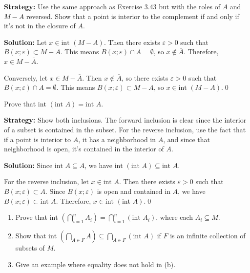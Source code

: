 \noindent\textbf{Strategy:} Use the same approach as Exercise 3.43 but with the roles of $A$ and $M-A$ reversed. Show that a point is interior to the complement if and only if it's not in the closure of $A$.

\bigskip\noindent\textbf{Solution:} Let $x \in \text{int }(M - A)$. Then there exists $\varepsilon > 0$ such that $B(x;\varepsilon) \subset M - A$. This means $B(x;\varepsilon) \cap A = \emptyset$, so $x \notin \overline{A}$. Therefore, $x \in M - \overline{A}$.

Conversely, let $x \in M - \overline{A}$. Then $x \notin \overline{A}$, so there exists $\varepsilon > 0$ such that $B(x;\varepsilon) \cap A = \emptyset$. This means $B(x;\varepsilon) \subset M - A$, so $x \in \text{int }(M - A)$.\qed


\begin{problembox}
\begin{problemstatement}
Prove that \(\text{int }(\text{int } A) = \text{int } A\).
\end{problemstatement}
\end{problembox}

\noindent\textbf{Strategy:} Show both inclusions. The forward inclusion is clear since the interior of a subset is contained in the subset. For the reverse inclusion, use the fact that if a point is interior to $A$, it has a neighborhood in $A$, and since that neighborhood is open, it's contained in the interior of $A$.

\bigskip\noindent\textbf{Solution:} Since $\text{int } A \subseteq A$, we have $\text{int }(\text{int } A) \subseteq \text{int } A$.

For the reverse inclusion, let $x \in \text{int } A$. Then there exists $\varepsilon > 0$ such that $B(x;\varepsilon) \subset A$. Since $B(x;\varepsilon)$ is open and contained in $A$, we have $B(x;\varepsilon) \subset \text{int } A$. Therefore, $x \in \text{int }(\text{int } A)$.\qed


\begin{problembox}
\begin{problemstatement}
\begin{enumerate}[label=\alph*)]
\item Prove that \(\text{int } \left(\bigcap_{i=1}^n A_i\right) = \bigcap_{i=1}^n (\text{int } A_i)\), where each \( A_i \subseteq M \).
\item Show that \(\text{int } \left(\bigcap_{A \in F} A\right) \subseteq \bigcap_{A \in F} (\text{int } A)\) if \( F \) is an infinite collection of subsets of \( M \).
\item Give an example where equality does not hold in (b).
\end{enumerate}
\end{problemstatement}
\end{problembox}

